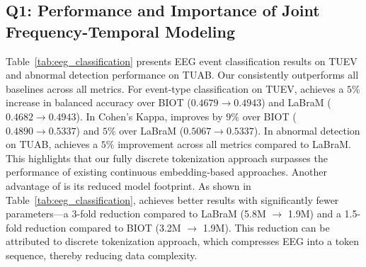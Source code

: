 \subsection{Q1: Performance and Importance of Joint Frequency-Temporal Modeling}
Table~\ref{tab:eeg_classification} presents EEG event classification results on TUEV and abnormal detection performance on TUAB. Our \method consistently outperforms all baselines across all metrics. For event-type classification on TUEV, \method achieves a $5\%$ increase in balanced accuracy over BIOT ($0.4679\rightarrow0.4943$) and LaBraM ($0.4682\rightarrow0.4943$). In Cohen's Kappa, \method improves by $9\%$ over BIOT ($0.4890\rightarrow0.5337$) and $5\%$ over LaBraM ($0.5067\rightarrow0.5337$). In abnormal detection on TUAB, \method achieves a $5\%$ improvement across all metrics compared to LaBraM. This highlights that our fully discrete tokenization approach surpasses the performance of existing continuous embedding-based approaches. 
Another advantage of \method is its reduced model footprint. As shown in Table~\ref{tab:eeg_classification}, \method achieves better results with significantly fewer parameters—a 3-fold reduction compared to LaBraM (5.8M $\rightarrow$ 1.9M) and a 1.5-fold reduction compared to BIOT (3.2M $\rightarrow$ 1.9M). This reduction can be attributed to discrete tokenization approach, which compresses EEG into a token sequence, thereby reducing data complexity.


